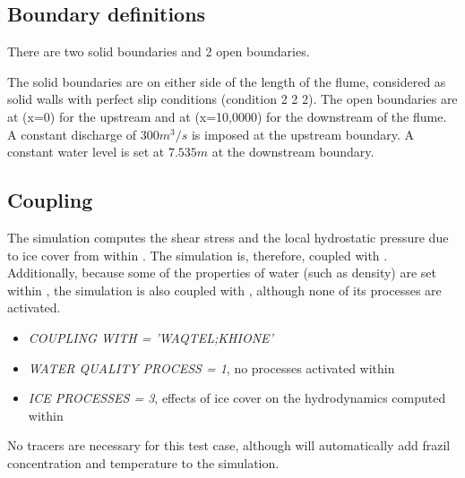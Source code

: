%
%
%

\subsection{Boundary definitions}
There are two solid boundaries and 2 open boundaries.

The solid boundaries are on either side of the length of the flume, considered as solid walls with perfect slip conditions (condition 2 2 2).
The open boundaries are at (x=0) for the upstream and at (x=10,0000) for the downstream of the flume. A constant discharge of $300m^3/s$ is imposed at the upstream boundary. A constant water level is set at $7.535m$ at the downstream boundary.

\subsection{Coupling}
The simulation computes the shear stress and the local hydrostatic pressure due to ice cover from within \khione. The simulation is, therefore, coupled with \khione. Additionally, because some of the properties of water (such as density) are set within \waqtel, the simulation is also coupled with \waqtel, although none of its processes are activated.
\begin{itemize}
    \item\textit{COUPLING WITH = 'WAQTEL;KHIONE'}
    \item\textit{WATER QUALITY PROCESS = 1}, no processes activated within \waqtel
    \item\textit{ICE PROCESSES = 3}, effects of ice cover on the hydrodynamics computed within \khione
\end{itemize}
No tracers are necessary for this test case, although \khione will automatically add frazil concentration and temperature to the simulation.

